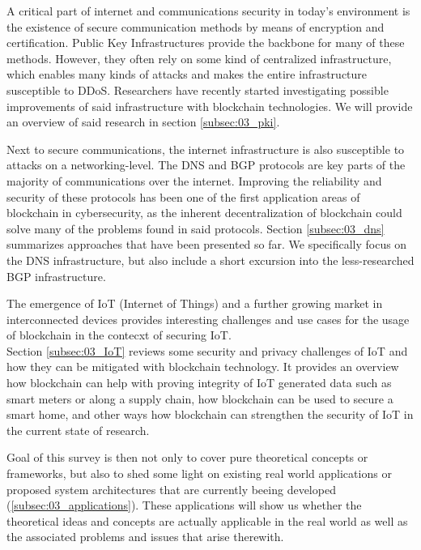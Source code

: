 A critical part of internet and communications security in today's environment is the existence of secure communication methods by means of encryption and certification. Public Key Infrastructures provide the backbone for many of these methods. However, they often rely on some kind of centralized infrastructure, which enables many kinds of attacks and makes the entire infrastructure susceptible to DDoS. Researchers have recently started investigating possible improvements of said infrastructure with blockchain technologies. We will provide an overview of said research in section \ref{subsec:03_pki}.

Next to secure communications, the internet infrastructure is also susceptible to attacks on a networking-level. The DNS and BGP protocols are key parts of the majority of communications over the internet. Improving the reliability and security of these protocols has been one of the first application areas of blockchain in cybersecurity, as the inherent decentralization of blockchain could solve many of the problems found in said protocols. Section \ref{subsec:03_dns} summarizes approaches that have been presented so far. We specifically focus on the DNS infrastructure, but also include a short excursion into the less-researched BGP infrastructure.

The emergence of IoT (Internet of Things) and a further growing market in interconnected devices provides interesting challenges and use cases for the usage of blockchain in the contecxt of securing IoT.\\
Section \ref{subsec:03_IoT} reviews some security and privacy challenges of IoT and how they can be mitigated with blockchain technology. It provides an overview how blockchain can help with proving integrity of IoT generated data such as smart meters or along a supply chain, how blockchain can be used to secure a smart home, and other ways how blockchain can strengthen the security of IoT in the current state of research.

Goal of this survey is then not only to cover pure theoretical concepts or frameworks, but also to shed some light on existing real world applications or proposed system architectures that are currently beeing developed (\ref{subsec:03_applications}). These applications will show us whether the theoretical ideas and concepts are actually applicable in the real world as well as the associated problems and issues that arise therewith.
